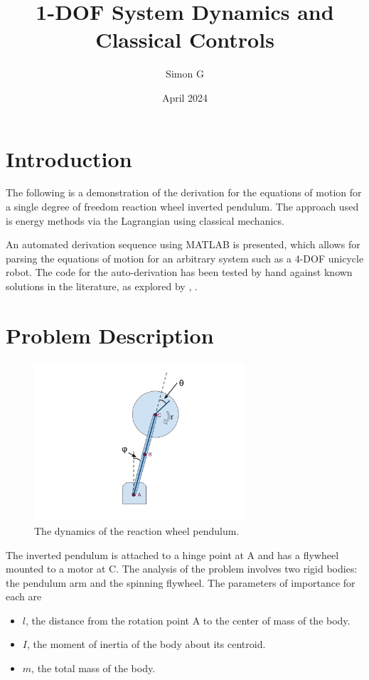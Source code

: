 \documentclass[11pt]{article}
\title{1-DOF System Dynamics and Classical Controls}
\author{Simon G}
\date{April 2024}
\begin{document}
\maketitle

\section{Introduction}
The following is a demonstration of the derivation for the equations of motion for a single degree of freedom reaction wheel inverted pendulum. The approach used is energy methods via the Lagrangian using classical mechanics.

An automated derivation sequence using MATLAB is presented, which allows for parsing the equations of motion for an arbitrary system such as a 4-DOF unicycle robot. The code for the auto-derivation has been tested by hand against known solutions in the literature, as explored by \cite{Brevik2017}, \cite{Montoya2020}.

\section{Problem Description}

\begin{figure}[H]
\centering
\includegraphics[width=0.7\textwidth]{Inverted Reaction Wheel.png} %
\caption{The dynamics of the reaction wheel pendulum.}
\label{fig:pendulum}
\end{figure}


The inverted pendulum is attached to a hinge point at A and has a flywheel mounted to a motor at C. The analysis of the problem involves two rigid bodies: the pendulum arm and the spinning flywheel. The parameters of importance for each are

\begin{itemize}
    \item $l$, the distance from the rotation point A to the center of mass of the body.
    \item $I$, the moment of inertia of the body about its centroid.
    \item $m$, the total mass of the body.
\end{itemize}  
\end{document}
